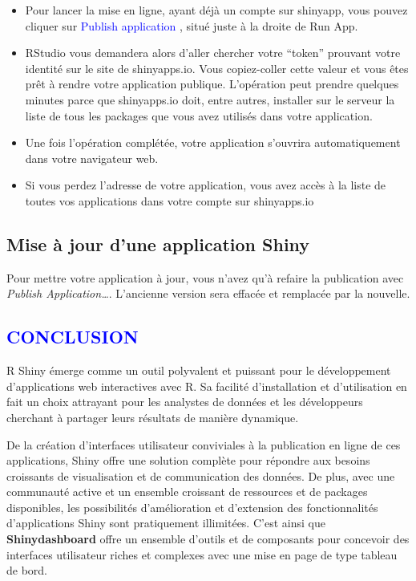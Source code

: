 \documentclass[
]{article}
\begin{document}
\begin{itemize}
\item
  Pour lancer la mise en ligne, ayant déjà un compte sur shinyapp, vous
  pouvez cliquer sur \textcolor{blue}{Publish application } , situé
  juste à la droite de Run App.
\item
  RStudio vous demandera alors d'aller chercher votre ``token'' prouvant
  votre identité sur le site de shinyapps.io. Vous copiez-coller cette
  valeur et vous êtes prêt à rendre votre application publique.
  L'opération peut prendre quelques minutes parce que shinyapps.io doit,
  entre autres, installer sur le serveur la liste de tous les packages
  que vous avez utilisés dans votre application.
\item
  Une fois l'opération complétée, votre application s'ouvrira
  automatiquement dans votre navigateur web.
\item
  Si vous perdez l'adresse de votre application, vous avez accès à la
  liste de toutes vos applications dans votre compte sur shinyapps.io
\end{itemize}

\hypertarget{mise-uxe0-jour-dune-application-shiny}{%
\subsection{Mise à jour d'une application
Shiny}\label{mise-uxe0-jour-dune-application-shiny}}

Pour mettre votre application à jour, vous n'avez qu'à refaire la
publication avec \emph{Publish Application\ldots{}}. L'ancienne version
sera effacée et remplacée par la nouvelle.

\newpage

\textcolor{blue}{\section*{CONCLUSION}}

R Shiny émerge comme un outil polyvalent et puissant pour le
développement d'applications web interactives avec R. Sa facilité
d'installation et d'utilisation en fait un choix attrayant pour les
analystes de données et les développeurs cherchant à partager leurs
résultats de manière dynamique.

De la création d'interfaces utilisateur conviviales à la publication en
ligne de ces applications, Shiny offre une solution complète pour
répondre aux besoins croissants de visualisation et de communication des
données. De plus, avec une communauté active et un ensemble croissant de
ressources et de packages disponibles, les possibilités d'amélioration
et d'extension des fonctionnalités d'applications Shiny sont
pratiquement illimitées. C'est ainsi que \textbf{Shinydashboard} offre
un ensemble d'outils et de composants pour concevoir des interfaces
utilisateur riches et complexes avec une mise en page de type tableau de
bord.
\end{document}
